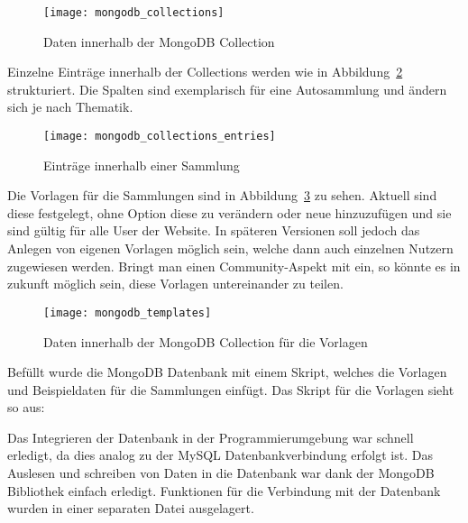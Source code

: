 \begin{figure}[h!]
    \centering
    \texttt{[image: mongodb\_collections]}
    \caption{Daten innerhalb der MongoDB Collection}
    \label{fig:mongodb_collections}
\end{figure}

Einzelne Einträge innerhalb der Collections werden wie in Abbildung~\ref{fig:mongodb_collections_entries} strukturiert.
Die Spalten sind exemplarisch für eine Autosammlung und ändern sich je nach Thematik.

\begin{figure}[h!]
    \centering
    \texttt{[image: mongodb\_collections\_entries]}
    \caption{Einträge innerhalb einer Sammlung}\label{fig:mongodb_collections_entries}
\end{figure}
\newpage

Die Vorlagen für die Sammlungen sind in Abbildung~\ref{fig:mongodb_templates} zu sehen.
Aktuell sind diese festgelegt, ohne Option diese zu verändern oder neue hinzuzufügen und sie sind gültig für alle User der Website.
In späteren Versionen soll jedoch das Anlegen von eigenen Vorlagen möglich sein, welche dann auch einzelnen Nutzern zugewiesen werden.
Bringt man einen Community-Aspekt mit ein, so könnte es in zukunft möglich sein, diese Vorlagen untereinander zu teilen.

\begin{figure}[h]
    \centering
    \texttt{[image: mongodb\_templates]}
    \caption{Daten innerhalb der MongoDB Collection für die Vorlagen}
    \label{fig:mongodb_templates}
\end{figure}
\newpage

Befüllt wurde die MongoDB Datenbank mit einem Skript, welches die Vorlagen und Beispieldaten für die Sammlungen einfügt.
Das Skript für die Vorlagen sieht so aus:

\vspace{1em}

\vspace{1em}

Das Integrieren der Datenbank in der Programmierumgebung war schnell erledigt, da dies analog zu der MySQL Datenbankverbindung erfolgt ist.
Das Auslesen und schreiben von Daten in die Datenbank war dank der MongoDB Bibliothek einfach erledigt.
Funktionen für die Verbindung mit der Datenbank wurden in einer separaten Datei ausgelagert.

